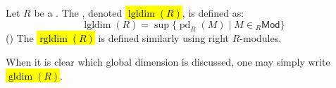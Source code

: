 \begin{definition} \label{definition:left_right_global_dimension_of_a_ring}
    Let $R$ be a .
The , denoted \hl{$\operatorname{lgldim}(R)$}, is defined as:
$$\operatorname{lgldim}(R) = \sup \{ \operatorname{pd}_R(M) \mid M \in {}_R\mathsf{Mod} \}$$
()
The  \hl{$\operatorname{rgldim}(R)$} is defined similarly using right $R$-modules. 

When it is clear which global dimension is discussed, one may simply write  \hl{$\operatorname{gldim}(R)$}.
\end{definition}